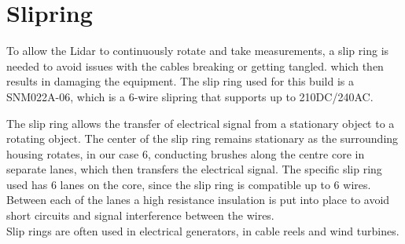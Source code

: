 \clearpage
\section{Slipring}

To allow the Lidar to continuously rotate and take measurements, a slip ring is needed to avoid issues with the cables breaking or getting tangled. which then results in damaging the equipment. 
The slip ring used for this build is a SNM022A-06\cite{slipring}, which is a 6-wire slipring that supports up to 210DC/240AC. 

The slip ring allows the transfer of electrical signal from a stationary object to a rotating object. The center of the slip ring remains stationary as the surrounding housing rotates, in our case 6, conducting brushes along the centre core in separate lanes, which then transfers the electrical signal.
The specific slip ring used has 6 lanes on the core, since the slip ring is compatible up to 6 wires. Between each of the lanes a high resistance insulation is put into place to avoid short circuits and signal interference between the wires.\cite{slipringhow} \\
Slip rings are often used in electrical generators, in cable reels and wind turbines.

